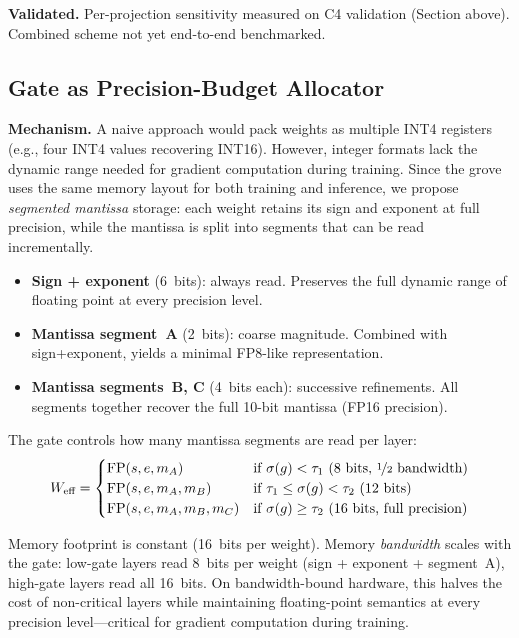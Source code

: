 \documentclass{article}
\begin{document}
\textbf{Validated.} Per-projection sensitivity measured on C4 validation
(Section above). Combined scheme not yet end-to-end benchmarked.

\subsection{Gate as Precision-Budget Allocator}
\label{sec:perf-gate-precision}

\textbf{Mechanism.} A naive approach would pack weights as multiple
INT4 registers (e.g., four INT4 values recovering INT16). However,
integer formats lack the dynamic range needed for gradient computation
during training. Since the grove uses the same memory layout for both
training and inference, we propose \emph{segmented mantissa} storage:
each weight retains its sign and exponent at full precision, while the
mantissa is split into segments that can be read incrementally.

\begin{itemize}[nosep]
\item \textbf{Sign + exponent} (6~bits): always read. Preserves the
      full dynamic range of floating point at every precision level.
\item \textbf{Mantissa segment~A} (2~bits): coarse magnitude.
      Combined with sign+exponent, yields a minimal FP8-like
      representation.
\item \textbf{Mantissa segments~B, C} (4~bits each): successive
      refinements. All segments together recover the full 10-bit
      mantissa (FP16 precision).
\end{itemize}

The gate controls how many mantissa segments are read per layer:
\begin{equation}
\label{eq:variable-precision}
W_{\text{eff}} = \begin{cases}
\text{FP}(s, e, m_A) & \text{if } \sigma(g) < \tau_1 \text{ (8 bits, \nicefrac{1}{2} bandwidth)} \\
\text{FP}(s, e, m_A, m_B) & \text{if } \tau_1 \leq \sigma(g) < \tau_2 \text{ (12 bits)} \\
\text{FP}(s, e, m_A, m_B, m_C) & \text{if } \sigma(g) \geq \tau_2 \text{ (16 bits, full precision)}
\end{cases}
\end{equation}

Memory footprint is constant (16~bits per weight).
Memory \emph{bandwidth} scales with the gate: low-gate layers read
8~bits per weight (sign + exponent + segment~A), high-gate layers read
all 16~bits. On bandwidth-bound hardware, this halves the cost of
non-critical layers while maintaining floating-point semantics at every
precision level---critical for gradient computation during training.
\end{document}
